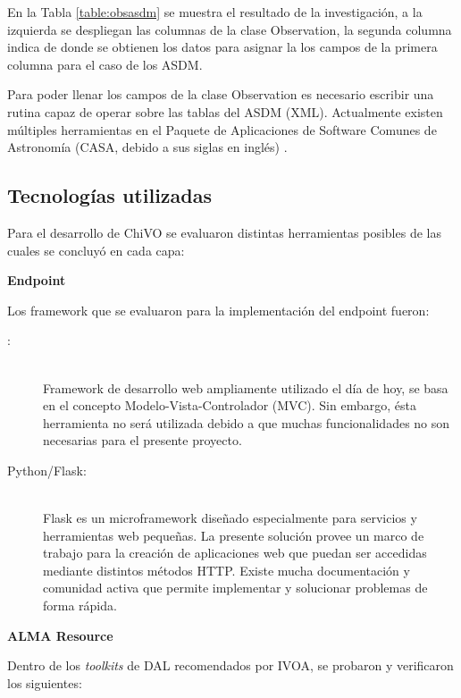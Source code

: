 En la Tabla \ref{table:obsasdm} se muestra el resultado de la investigación,
a la izquierda se despliegan las columnas de la clase Observation,
la segunda columna indica de donde se obtienen los datos para asignar la los campos
de la primera columna para el caso de los ASDM.

Para poder llenar los campos de la clase Observation es necesario escribir una
rutina capaz de operar sobre las tablas del ASDM (XML).
Actualmente existen múltiples herramientas en el Paquete de Aplicaciones de Software
Comunes de Astronomía (CASA, debido a sus siglas en inglés) \cite{petry2012analysing}.

\subsection{Tecnologías utilizadas}

Para el desarrollo de ChiVO se evaluaron distintas herramientas posibles de las
cuales se concluyó en cada capa:

\textbf{Endpoint}

Los framework que se evaluaron para la implementación del endpoint fueron:

\begin{description}
    \item[{\ror}:] \hfill \\
        Framework de desarrollo web ampliamente utilizado el día de hoy,
        se basa en el concepto Modelo-Vista-Controlador (MVC).
        Sin embargo, ésta herramienta no será utilizada debido
        a que muchas funcionalidades no son necesarias para el presente proyecto.
    \item[Python/Flask:] \hfill \\
        Flask es un microframework diseñado especialmente para servicios y
        herramientas web pequeñas.
        La presente solución provee un marco de trabajo para la creación de
        aplicaciones web que puedan ser accedidas mediante distintos métodos HTTP.
        Existe mucha documentación y comunidad activa que permite implementar y
        solucionar problemas de forma rápida.
\end{description}

\textbf{ALMA Resource}

Dentro de los \emph{toolkits} de DAL recomendados por IVOA,
se probaron y verificaron los siguientes:

